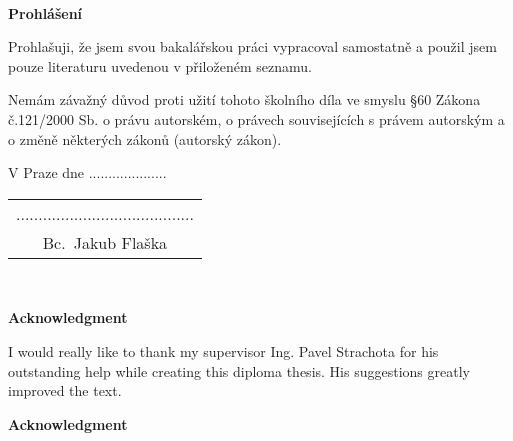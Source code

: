 \documentclass[a4paper,12pt]{report}	%
\newcommand{\autor}{Bc.~Jakub Flaška}
\begin{document}
 

\newpage


\newpage
\tableofcontents


\newpage
\thispagestyle{empty} 

 

\newpage
\thispagestyle{empty}

~
\vfill %

{\bf Prohlášení}

\vspace{0.5cm} %
Prohlašuji, že jsem svou bakalářskou práci vypracoval samostatně a použil jsem pouze literaturu uvedenou v přiloženém seznamu.

Nemám závažný důvod proti užití tohoto školního díla ve smyslu \S60 Zákona č.121/2000 Sb. o právu autorském, o právech souvisejících s právem autorským a o změně některých zákonů (autorský zákon).


\vspace{5mm}V Praze dne ....................\hfill
	\begin{tabular}{c}
	........................................\\ 
	\autor
	\end{tabular}



\newpage
\thispagestyle{empty}

~
\vfill %

{\bf Acknowledgment}

\vspace{5mm} %

I would really like to thank my supervisor Ing. Pavel Strachota for his outstanding help while creating this diploma thesis. His suggestions greatly improved the text.

\vspace{5mm} %

{\bf Acknowledgment}
\end{document}
